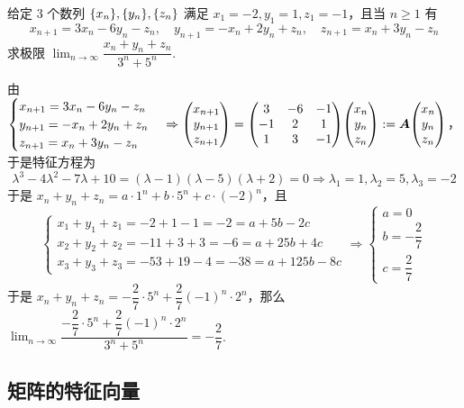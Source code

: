 \begin{example}
    给定 3 个数列 $\qty{x_n},\qty{y_n},\qty{z_n}$ 满足 $x_1=-2,y_1=1,z_1=-1$，且当 $n\geqslant 1$ 有
    $$x_{n+1}=3x_n-6y_n-z_n,\quad y_{n+1}=-x_n+2y_n+z_n,\quad z_{n+1}=x_n+3y_n-z_n$$
    求极限 $\displaystyle\lim_{n\to\infty}\dfrac{x_n+y_n+z_n}{3^n+5^n}.$
\end{example}
\begin{solution}
    由 $\begin{cases}
            x_{n+1}=3x_n-6y_n-z_n \\
            y_{n+1}=-x_n+2y_n+z_n \\
            z_{n+1}=x_n+3y_n-z_n
        \end{cases}\Rightarrow \mqty(x_{n+1}\\y_{n+1}\\z_{n+1})=\mqty(3&-6&-1\\-1&2&1\\1&3&-1)\mqty(x_{n}\\y_n\\z_n):=\vb*{A}\mqty(x_{n}\\y_n\\z_n)$，于是特征方程为
    $$\lambda^3-4\lambda^2-7\lambda+10=(\lambda-1)(\lambda-5)(\lambda+2)=0\Rightarrow \lambda_1=1,\lambda_2=5,\lambda_3=-2$$
    于是 $x_n+y_n+z_n=a\cdot 1^n+b\cdot 5^n+c\cdot (-2)^n$，且
    $$\begin{cases}
            x_1+y_1+z_1=-2+1-1=-2=a+5b-2c   \\
            x_2+y_2+z_2=-11+3+3=-6=a+25b+4c \\
            x_3+y_3+z_3=-53+19-4=-38=a+125b-8c
        \end{cases}\Rightarrow \begin{cases}
            a=0             \\
            b=-\dfrac{2}{7} \\[6pt]
            c=\dfrac{2}{7}
        \end{cases}$$
    于是 $x_n+y_n+z_n=-\dfrac{2}{7}\cdot 5^n+\dfrac{2}{7}(-1)^n\cdot 2^n$，那么 $\displaystyle\lim_{n\to\infty}\dfrac{-\dfrac{2}{7}\cdot 5^n+\dfrac{2}{7}(-1)^n\cdot 2^n}{3^n+5^n}=-\dfrac{2}{7}$.
\end{solution}

\subsection{矩阵的特征向量}


